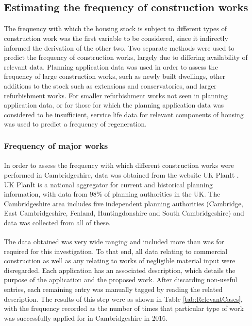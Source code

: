 \documentclass[12pt]{article}
\begin{document}
\subsection{Estimating the frequency of construction works}
\label{FreqOfWorks}

\paragraph{}
The frequency with which the housing stock is subject to different types of construction work was the first variable to be considered, since it indirectly informed the derivation of the other two. Two separate methods were used to predict the frequency of construction works, largely due to differing availability of relevant data. Planning application data was used in order to assess the frequency of large construction works, such as newly built dwellings, other additions to the stock such as extensions and conservatories, and larger refurbishment works. For smaller refurbishment works not seen in planning application data, or for those for which the planning application data was considered to be insufficient, service life data for relevant components of housing was used to predict a frequency of regeneration.

\subsubsection{Frequency of major works}
\label{FreqMajor}

\paragraph{}
In order to assess the frequency with which different construction works were performed in Cambridgeshire, data was obtained from the website UK PlanIt \citep{Speakman_undated-sd}. UK PlanIt is a national aggregator for current and historical planning information, with data from 98\% of planning authorities in the UK. The Cambridgeshire area includes five independent planning authorities (Cambridge, East Cambridgeshire, Fenland, Huntingdonshire and South Cambridgeshire) and data was collected from all of these.

\paragraph{}
The data obtained was very wide ranging and included more than was for required for this investigation. To that end, all data relating to commercial construction as well as any relating to works of negligible material input were disregarded. Each application has an associated description, which details the purpose of the application and the proposed work. After discarding non-useful entries, each remaining entry was manually tagged by reading the related description. The results of this step were as shown in Table \ref{tab:RelevantCases}, with the frequency recorded as the number of times that particular type of work was successfully applied for in Cambridgeshire in 2016.
\end{document}
